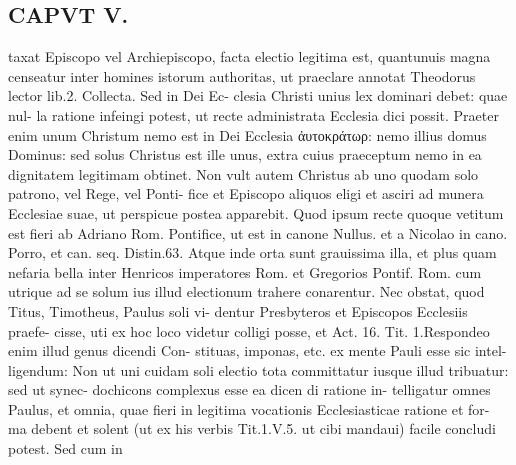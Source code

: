 \documentclass{article}
\begin{document}
\begin{pages}
\section*{CAPVT  V. }
\marginpar{[ p.347 ]}taxat Episcopo vel Archiepiscopo, facta electio legitima est, quantunuis magna censeatur inter homines istorum authoritas, ut praeclare annotat Theodorus lector lib.2. Collecta. Sed in Dei Ec- clesia Christi unius lex dominari debet: quae nul- la ratione infeingi potest, ut recte administrata Ecclesia dici possit. Praeter enim unum Christum nemo est in Dei Ecclesia ἀυτοκράτωρ: nemo illius domus Dominus: sed solus Christus est ille unus, extra cuius praeceptum nemo in ea dignitatem legitimam obtinet. Non vult autem Christus ab uno quodam solo patrono, vel Rege, vel Ponti- fice et Episcopo aliquos eligi et asciri ad munera Ecclesiae suae, ut perspicue postea apparebit. Quod ipsum recte quoque vetitum est fieri ab Adriano Rom. Pontifice, ut est in canone Nullus. et a Nicolao in cano. Porro, et can. seq. Distin.63. Atque inde orta sunt grauissima illa, et plus quam nefaria bella inter Henricos imperatores Rom. et Gregorios Pontif. Rom. cum utrique ad se solum ius illud electionum trahere conarentur. Nec obstat, quod Titus, Timotheus, Paulus soli vi- dentur Presbyteros et Episcopos Ecclesiis praefe- cisse, uti ex hoc loco videtur colligi posse, et Act. 16. Tit. 1.Respondeo enim illud genus dicendi Con- stituas, imponas, etc. ex mente Pauli esse sic intel- ligendum: Non ut uni cuidam soli electio tota committatur iusque illud tribuatur: sed ut synec- dochicons complexus esse ea dicen di ratione in- telligatur omnes Paulus, et omnia, quae fieri in legitima vocationis Ecclesiasticae ratione et for- ma debent et solent (ut ex his verbis Tit.1.V.5. ut cibi mandaui) facile concludi potest. Sed cum in 

\end{pages}
\end{document}
